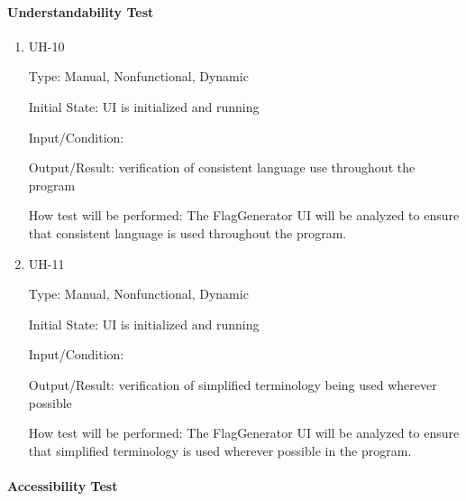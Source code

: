 \documentclass[12pt, titlepage]{article}
\begin{document}
\paragraph{Understandability Test}

\begin{enumerate}

\item{UH-10\\}

Type: Manual, Nonfunctional, Dynamic

Initial State: UI is initialized and running

Input/Condition: 

Output/Result: verification of consistent language use throughout the program

How test will be performed: The FlagGenerator UI will be analyzed to ensure
that consistent language is used throughout the program.

\item{UH-11\\}

Type: Manual, Nonfunctional, Dynamic

Initial State: UI is initialized and running

Input/Condition: 

Output/Result: verification of simplified terminology being used wherever
possible

How test will be performed: The FlagGenerator UI will be analyzed to ensure
that simplified terminology is used wherever possible in the program.

\end{enumerate}

\paragraph{Accessibility Test}
\end{document}
